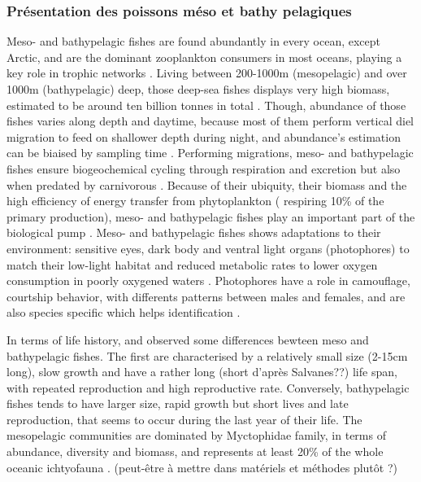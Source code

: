 \subsubsection*{Présentation des poissons méso et bathy pelagiques}
Meso- and bathypelagic fishes are found abundantly in every ocean, except Arctic, and are the dominant zooplankton consumers in most oceans, playing a key role in trophic networks \citep{davison2015,salvanes2009}. Living between 200-1000m (mesopelagic) and over 1000m (bathypelagic) deep, those deep-sea fishes displays very high biomass, estimated to be around ten billion tonnes in total \citep{garcia2021,gjoesaeter1980,richards2019}. Though, abundance of those fishes varies along depth and daytime, because most of them perform vertical diel migration to feed on shallower depth during night, and abundance's estimation can be biaised by sampling time \citep{catul2011,gaskett2001,garcia2021,pusch2004,salvanes2009}. Performing migrations, meso- and bathypelagic fishes ensure biogeochemical cycling through respiration and excretion but also when predated by carnivorous \citep{garcia2021,spitz2019}. Because of their ubiquity, their biomass and the high efficiency of energy transfer from phytoplankton ( respiring 10\% of the primary production),  meso- and bathypelagic fishes play an important part of the biological pump \citep{garcia2021,spitz2019}.
Meso- and bathypelagic fishes shows adaptations to their environment: sensitive eyes, dark body and ventral light organs (photophores) to match their low-light habitat and reduced metabolic rates to lower oxygen consumption in poorly oxygened waters \citep{salvanes2009}. Photophores have a role in camouflage, courtship behavior, with differents patterns between males and females, and are also species specific which helps identification \citep{paitio2020,salvanes2009}. 

In terms of life history, \citet{childress1980} and \citet{salvanes2009} observed some differences bewteen meso and bathypelagic fishes. The first are characterised by a relatively small size (2-15cm long), slow growth and have a rather long (short d'après Salvanes??) life span, with repeated reproduction and high reproductive rate. Conversely, bathypelagic fishes tends to have larger size, rapid growth but short lives and late reproduction, that seems to occur during the last year of their life. The mesopelagic communities are dominated by Myctophidae family, in terms of abundance, diversity and biomass, and represents at least 20\% of the whole oceanic ichtyofauna \citep{catul2011,kozlov1995,pusch2004}. (peut-être à mettre dans matériels et méthodes plutôt ?)


